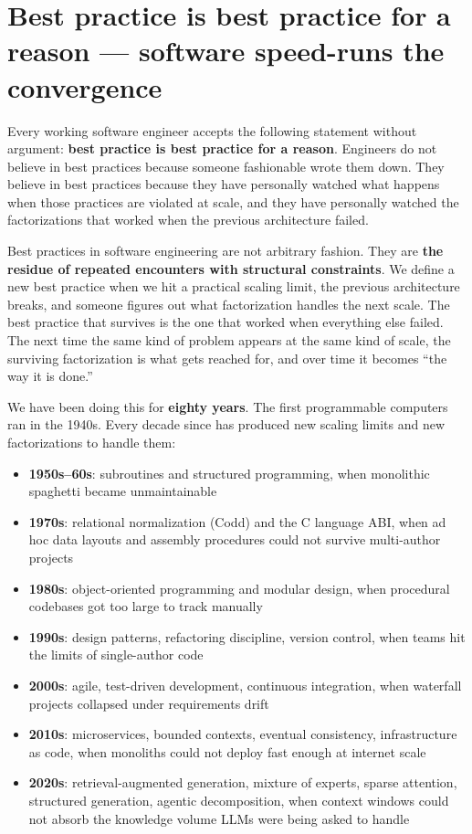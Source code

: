 \documentclass[11pt]{article}
\begin{document}
\section{Best practice is best practice for a reason --- software speed-runs the convergence}
\label{sec:speed-run}

Every working software engineer accepts the following statement without argument: \textbf{best practice is best practice for a reason}. Engineers do not believe in best practices because someone fashionable wrote them down. They believe in best practices because they have personally watched what happens when those practices are violated at scale, and they have personally watched the factorizations that worked when the previous architecture failed.

Best practices in software engineering are not arbitrary fashion. They are \textbf{the residue of repeated encounters with structural constraints}. We define a new best practice when we hit a practical scaling limit, the previous architecture breaks, and someone figures out what factorization handles the next scale. The best practice that survives is the one that worked when everything else failed. The next time the same kind of problem appears at the same kind of scale, the surviving factorization is what gets reached for, and over time it becomes ``the way it is done.''

We have been doing this for \textbf{eighty years}. The first programmable computers ran in the 1940s. Every decade since has produced new scaling limits and new factorizations to handle them:

\begin{itemize}[leftmargin=*]
\item \textbf{1950s--60s}: subroutines and structured programming, when monolithic spaghetti became unmaintainable
\item \textbf{1970s}: relational normalization (Codd) and the C language ABI, when ad hoc data layouts and assembly procedures could not survive multi-author projects
\item \textbf{1980s}: object-oriented programming and modular design, when procedural codebases got too large to track manually
\item \textbf{1990s}: design patterns, refactoring discipline, version control, when teams hit the limits of single-author code
\item \textbf{2000s}: agile, test-driven development, continuous integration, when waterfall projects collapsed under requirements drift
\item \textbf{2010s}: microservices, bounded contexts, eventual consistency, infrastructure as code, when monoliths could not deploy fast enough at internet scale
\item \textbf{2020s}: retrieval-augmented generation, mixture of experts, sparse attention, structured generation, agentic decomposition, when context windows could not absorb the knowledge volume LLMs were being asked to handle
\end{itemize}
\end{document}
